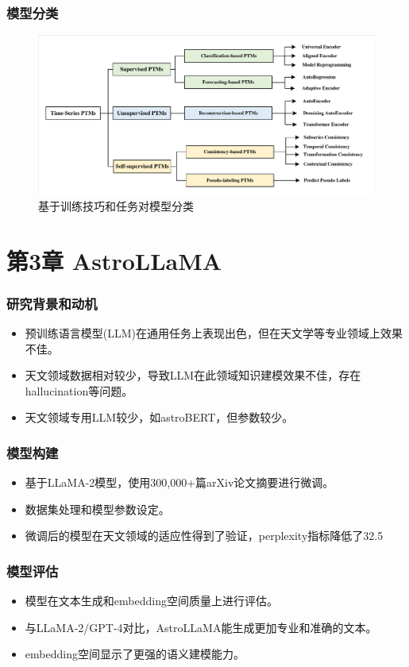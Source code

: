 \documentclass[10pt]{ctexbeamer}
\begin{document}
\begin{frame}[t]
  \frametitle{模型分类}
  \begin{figure}
    \includegraphics[width=.8\textwidth, height=.8\textheight, keepaspectratio]{taxonomy.pdf}
    \caption{基于训练技巧和任务对模型分类}
  \end{figure}
\end{frame}

\section[AstroLLaMA]{ 第3章 AstroLLaMA}\label{sec:3}



\begin{frame}[t]
  \frametitle{研究背景和动机}
  \begin{itemize}
    \item 预训练语言模型(LLM)在通用任务上表现出色，但在天文学等专业领域上效果不佳。
    \item 天文领域数据相对较少，导致LLM在此领域知识建模效果不佳，存在hallucination等问题。
    \item 天文领域专用LLM较少，如astroBERT，但参数较少。
  \end{itemize}
\end{frame}

\begin{frame}[t]
  \frametitle{模型构建}
  \begin{itemize}
    \item 基于LLaMA-2模型，使用300,000+篇arXiv论文摘要进行微调。
    \item 数据集处理和模型参数设定。
    \item 微调后的模型在天文领域的适应性得到了验证，perplexity指标降低了32.5%
  \end{itemize}
\end{frame}

\begin{frame}[t]
  \frametitle{模型评估}
  \begin{itemize}
    \item 模型在文本生成和embedding空间质量上进行评估。
    \item 与LLaMA-2/GPT-4对比，AstroLLaMA能生成更加专业和准确的文本。
    \item embedding空间显示了更强的语义建模能力。
  \end{itemize}
\end{frame}
\end{document}
